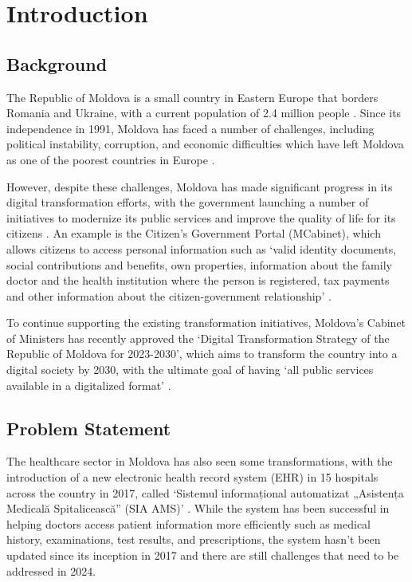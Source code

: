\chapter{Introduction}
\label{chap:introduction}

\section{Background}

The Republic of Moldova is a small country in Eastern Europe that borders Romania and Ukraine, with a current population of 2.4 million people \parencite{mdpop}. Since its independence in 1991, Moldova has faced a number of challenges, including political instability, corruption, and economic difficulties which have left Moldova as one of the poorest countries in Europe \parencite{mdpoverty}. 

However, despite these challenges, Moldova has made significant progress in its digital transformation efforts, with the government launching a number of initiatives to modernize its public services and improve the quality of life for its citizens \parencite{mdega}. An example is the Citizen's Government Portal (MCabinet), which allows citizens to access personal information such as `valid identity documents, social contributions and benefits, own properties, information about the family doctor and the health institution where the person is registered, tax payments and other information about the citizen-government relationship' \parencite{mdcabinet}. 

To continue supporting the existing transformation initiatives, Moldova's Cabinet of Ministers has recently approved the `Digital Transformation Strategy of the Republic of Moldova for 2023-2030', which aims to transform the country into a digital society by 2030, with the ultimate goal of having `all public services available in a digitalized format' \parencite{mdstrategy}.

\section{Problem Statement}

The healthcare sector in Moldova has also seen some transformations, with the introduction of a new electronic health record system (EHR) in 15 hospitals across the country in 2017, called `Sistemul informațional automatizat „Asistența Medicală Spitalicească” (SIA AMS)' \parencite{mdehr}. While the system has been successful in helping doctors access patient information more efficiently such as medical history, examinations, test results, and prescriptions, the system hasn't been updated since its inception in 2017 and there are still challenges that need to be addressed in 2024. 

